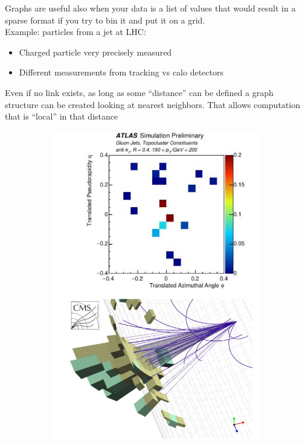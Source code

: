 Graphs are useful also when your data is a list of values
that would result in a sparse format if you try to bin it and
put it on a grid.\\
Example: particles from a jet at LHC:
\begin{itemize}
	\item Charged particle very precisely measured
	\item Different measurements from tracking vs calo detectors
\end{itemize}

Even if no link exists, as long as some “distance” can be
defined a graph structure can be created looking at
nearest neighbors. That allows computation that is “local” in that distance

\begin{figure}[ht]
	\centering
	\begin{subfigure}{.4\textwidth}
		\centering
		\includegraphics[width=0.9\linewidth]{figure_ml/sparse}

\end{subfigure}
\end{figure}
